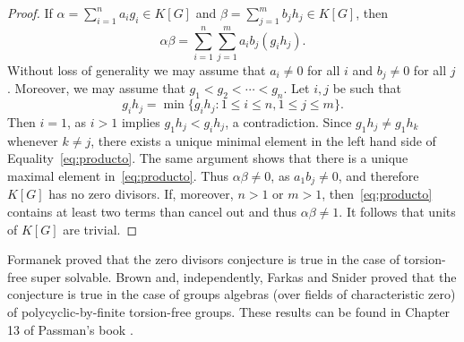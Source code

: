 \begin{proof}
	If $\alpha=\sum_{i=1}^na_ig_i\in K[G]$ and
	$\beta=\sum_{j=1}^mb_jh_j\in K[G]$, then 
	\begin{equation}
		\label{eq:producto}
		\alpha\beta=\sum_{i=1}^n\sum_{j=1}^ma_ib_j(g_ih_j).
	\end{equation}
	Without loss of generality we may assume that $a_i\ne 0$ for
	all $i$ and $b_j\ne 0$ for all $j$. Moreover, we may assume that 
	$g_1<g_2<\cdots<g_n$. Let $i,j$ be such that 
	\[
		g_ih_j=\min\{g_ih_j:1\leq i\leq n,1\leq j\leq m\}.
	\]
	Then $i=1$, as $i>1$ implies
	$g_1h_j<g_ih_j$, a contradiction. Since $g_1h_j\ne g_1h_k$ whenever 
	$k\ne j$, there exists a unique minimal element in the left hand side of Equality~\eqref{eq:producto}. The same argument shows that there is a unique
	maximal element in~\eqref{eq:producto}. Thus 
	$\alpha\beta\ne 0$, as $a_1b_j\ne 0$, and therefore $K[G]$ has no zero divisors. 
	If, moreover, $n>1$ or $m>1$, then~\eqref{eq:producto} contains at least two
	terms than cancel out and thus  
	$\alpha\beta\ne1$. It follows that units of $K[G]$ are trivial. 
\end{proof}

Formanek proved that the zero divisors conjecture is true 
in the case of torsion-free super solvable. Brown and, independently, 
Farkas and Snider proved that the conjecture is true 
in the case of groups algebras (over fields of characteristic zero) of 
polycyclic-by-finite torsion-free groups. These results
can be found in Chapter 13 of
Passman's book \cite{MR798076}. 

